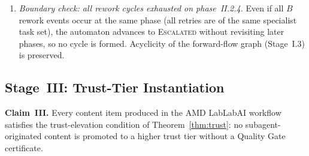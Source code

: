 \documentclass[12pt]{article}
\theoremstyle{definition}
\begin{document}
\begin{enumerate}
    \item[II.6] \emph{Boundary check: all rework cycles exhausted
                on phase~II.2.4.}  Even if all $B$ rework events occur
                at the same phase (all retries are of the same specialist
                task set), the automaton advances to \textsc{Escalated}
                without revisiting later phases, so no cycle is formed.
                Acyclicity of the forward-flow graph (Stage~I.3) is
                preserved. \checkmark
\end{enumerate}

\subsection{Stage~III: Trust-Tier Instantiation}
\label{sec:case-study-trust}

\noindent\textbf{Claim~III.}  Every content item produced in the
AMD LabLabAI workflow satisfies the trust-elevation condition of
Theorem~\ref{thm:trust}: no subagent-originated content is promoted
to a higher trust tier without a Quality Gate certificate.
\end{document}
